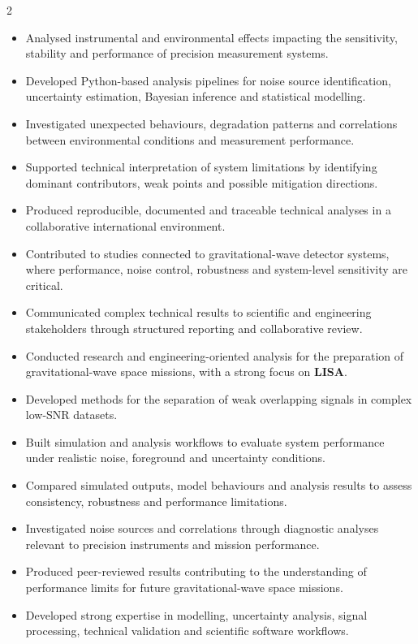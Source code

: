 \documentclass[8pt,a4paper,ragged2e,withhyper]{altacv}
\begin{document}
\begin{paracol}{2}
\begin{itemize}
\item Analysed instrumental and environmental effects impacting the sensitivity, stability and performance of precision measurement systems.
\item Developed Python-based analysis pipelines for noise source identification, uncertainty estimation, Bayesian inference and statistical modelling.
\item Investigated unexpected behaviours, degradation patterns and correlations between environmental conditions and measurement performance.
\item Supported technical interpretation of system limitations by identifying dominant contributors, weak points and possible mitigation directions.
\item Produced reproducible, documented and traceable technical analyses in a collaborative international environment.
\item Contributed to studies connected to gravitational-wave detector systems, where performance, noise control, robustness and system-level sensitivity are critical.
\item Communicated complex technical results to scientific and engineering stakeholders through structured reporting and collaborative review.
\end{itemize}

\divider


\begin{itemize}
\item Conducted research and engineering-oriented analysis for the preparation of gravitational-wave space missions, with a strong focus on \textbf{LISA}.
\item Developed methods for the separation of weak overlapping signals in complex low-SNR datasets.
\item Built simulation and analysis workflows to evaluate system performance under realistic noise, foreground and uncertainty conditions.
\item Compared simulated outputs, model behaviours and analysis results to assess consistency, robustness and performance limitations.
\item Investigated noise sources and correlations through diagnostic analyses relevant to precision instruments and mission performance.
\item Produced peer-reviewed results contributing to the understanding of performance limits for future gravitational-wave space missions.
\item Developed strong expertise in modelling, uncertainty analysis, signal processing, technical validation and scientific software workflows.
\end{itemize}


\end{paracol}
\end{document}
